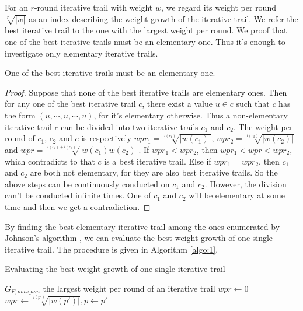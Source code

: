 For an $r$-round iterative trail with weight $w$, we regard its weight per round $\sqrt[r]{|w|}$ as an index describing the weight growth of the iterative trail. We refer the best iterative trail to the one with the largest weight per round. We proof that one of the best iterative trails must be an elementary one. Thus it's enough to investigate only elementary iterative trails. 

\begin{theorem}
	One of the best iterative trails must be an elementary one.
\end{theorem}

\begin{proof}
	Suppose that none of the best iterative trails are elementary ones. Then for any one of the best iterative trail $c$, there exist a value $u\in c$ such that $c$ has the form $(u,\cdots,u,\cdots,u)$, for it's elementary otherwise. Thus a non-elementary iterative trail $c$ can be divided into two iterative trails $c_1$ and $c_2$. The weight per round of $c_1$, $c_2$ and $c$ is respectively $wpr_1=\sqrt[l(c_1)]{|w(c_1)|}$, $wpr_2=\sqrt[l(c_2)]{|w(c_2)|}$ and $wpr=\sqrt[l(c_1)+l(c_2)]{|w(c_1)w(c_2)|}$. If $wpr_1< wpr_2$, then $wpr_1<wpr<wpr_2$, which contradicts to that $c$ is a best iterative trail. Else if $wpr_1=wpr_2$, then $c_1$ and $c_2$ are both not elementary, for they are also best iterative trails. So the above steps can be continuously conducted on $c_1$ and $c_2$. However, the division can't be conducted infinite times. One of $c_1$ and $c_2$ will be elementary at some time and then we get a contradiction. 
\end{proof}

By finding the best elementary iterative trail among the ones enumerated by Johnson's algorithm \cite{J75}, we can evaluate the best weight growth of one single iterative trail. The procedure is given in Algorithm \ref{algo:1}. %

\begin{algorithm}
	\caption{Evaluating the best weight growth of one single iterative trail}
	\label{algo:1}
	\begin{algorithmic}[1]
		\Require $G_{F,max\_asn}$
		\Ensure the largest weight per round of an iterative trail
		\Procedure {}{}
		\State $wpr\leftarrow 0$
		\State $wpr\leftarrow \sqrt[l(p')]{|w(p')|},p\leftarrow p'$
		\EndIf
		\EndFor
		\State {}
		\EndProcedure
	\end{algorithmic}
\end{algorithm}

